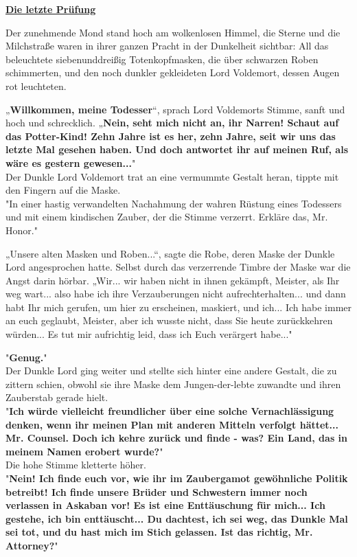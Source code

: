 

\hypertarget{die-letzte-pruxfcfung}{%

\textbf{\uline{Die letzte Prüfung}}

Der zunehmende Mond stand hoch am wolkenlosen Himmel, die Sterne und die Milchstraße waren in ihrer ganzen Pracht in der Dunkelheit sichtbar: All das beleuchtete siebenunddreißig Totenkopfmasken, die über schwarzen Roben schimmerten, und den noch dunkler gekleideten Lord Voldemort, dessen Augen rot leuchteten.

„\textbf{Willkommen, meine Todesser}“, sprach Lord Voldemorts Stimme, sanft und hoch und schrecklich. „\textbf{Nein, seht mich nicht an, ihr Narren! Schaut auf das Potter-Kind! Zehn Jahre ist es her, zehn Jahre, seit wir uns das letzte Mal gesehen haben. Und doch antwortet ihr auf meinen Ruf, als wäre es gestern gewesen...}"\\ Der Dunkle Lord Voldemort trat an eine vermummte Gestalt heran, tippte mit den Fingern auf die Maske.\\ "In einer hastig verwandelten Nachahmung der wahren Rüstung eines Todessers und mit einem kindischen Zauber, der die Stimme verzerrt. Erkläre das, Mr. Honor."

„Unsere alten Masken und Roben...“, sagte die Robe, deren Maske der Dunkle Lord angesprochen hatte. Selbst durch das verzerrende Timbre der Maske war die Angst darin hörbar. „Wir... wir haben nicht in ihnen gekämpft, Meister, als Ihr weg wart... also habe ich ihre Verzauberungen nicht aufrechterhalten... und dann habt Ihr mich gerufen, um hier zu erscheinen, maskiert, und ich... Ich habe immer an euch geglaubt, Meister, aber ich wusste nicht, dass Sie heute zurückkehren würden... Es tut mir aufrichtig leid, dass ich Euch verärgert habe..."

"\textbf{Genug.}"\\ Der Dunkle Lord ging weiter und stellte sich hinter eine andere Gestalt, die zu zittern schien, obwohl sie ihre Maske dem Jungen-der-lebte zuwandte und ihren Zauberstab gerade hielt.\\ "\textbf{Ich würde vielleicht freundlicher über eine solche Vernachlässigung denken, wenn ihr meinen Plan mit anderen Mitteln verfolgt hättet... Mr. Counsel. Doch ich kehre zurück und finde - was? Ein Land, das in meinem Namen erobert wurde?}"\\ Die hohe Stimme kletterte höher.\\ "\textbf{Nein! Ich finde euch vor, wie ihr im Zaubergamot gewöhnliche Politik betreibt! Ich finde unsere Brüder und Schwestern immer noch verlassen in Askaban vor! Es ist eine Enttäuschung für mich... Ich gestehe, ich bin enttäuscht... Du dachtest, ich sei weg, das Dunkle Mal sei tot, und du hast mich im Stich gelassen. Ist das richtig, Mr. Attorney?}"

}
